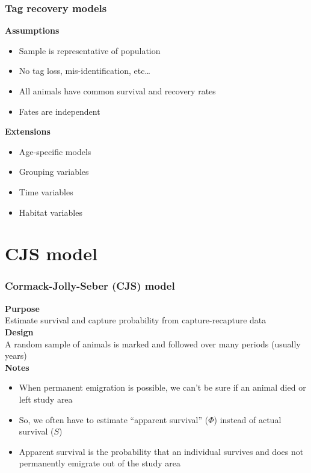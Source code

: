 \documentclass[color=usenames,dvipsnames]{beamer}\usepackage[]{graphicx}\usepackage[]{color}
\begin{document}
\begin{frame}
  \frametitle{Tag recovery models}
  \large
  {\bf Assumptions}
  \begin{itemize}
    \item Sample is representative of population
    \item No tag loss, mis-identification, etc\dots
    \item All animals have common survival and recovery rates
    \item Fates are independent
  \end{itemize}
  \pause
  \vspace{0.5cm}
  {\bf Extensions}
  \begin{itemize}
    \item Age-specific models
    \item Grouping variables
    \item Time variables
    \item Habitat variables
  \end{itemize}
\end{frame}




\section{CJS model}

\begin{frame}
  \frametitle{Cormack-Jolly-Seber (CJS) model}
  {\bf Purpose} \\
  Estimate survival and capture probability from capture-recapture data \\
  \pause
  \vspace{0.5cm}
  {\bf Design} \\
  A random sample of animals is marked and followed over many periods
  (usually years) \\
  \pause
  \vspace{0.5cm}
  {\bf Notes} \\
  \begin{itemize}[<+->]
    \item When permanent emigration is possible, we can't be sure if
    an animal died or left study area
    \item So, we often have to estimate ``apparent survival'' ($\Phi$)
      instead of actual survival ($S$)
    \item Apparent survival is the probability that an individual
      survives and does not permanently emigrate out of the study area
  \end{itemize}
\end{frame}
\end{document}
